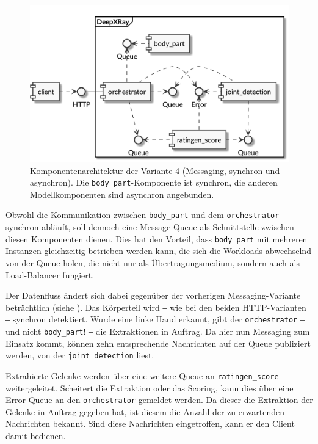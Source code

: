 \begin{figure}[tbh]
    \centering
    \includegraphics[width=\linewidth]{pics/architektur-variante-queue-2.png}
    \caption{Komponentenarchitektur der Variante 4 (Messaging, synchron und asynchron). Die \texttt{body\_part}-Komponente ist synchron, die anderen Modellkomponenten sind asynchron angebunden.}
    \label{fig:architektur-variante-queue-2}
\end{figure}

Obwohl die Kommunikation zwischen \texttt{body\_part} und dem \texttt{orchestrator} synchron abläuft, soll dennoch eine Message-Queue als Schnittstelle zwischen diesen Komponenten dienen. Dies hat den Vorteil, dass \texttt{body\_part} mit mehreren Instanzen gleichzeitig betrieben werden kann, die sich die Workloads abwechselnd von der Queue holen, die nicht nur als Übertragungsmedium, sondern auch als Load-Balancer fungiert.

Der Datenfluss ändert sich dabei gegenüber der vorherigen Messaging-Variante beträchtlich (siehe ). Das Körperteil wird ‒ wie bei den beiden HTTP-Varianten ‒ synchron detektiert. Wurde eine linke Hand erkannt, gibt der \texttt{orchestrator} ‒ und nicht \texttt{body\_part}! ‒ die Extraktionen in Auftrag. Da hier nun Messaging zum Einsatz kommt, können zehn entsprechende Nachrichten auf der Queue publiziert werden, von der \texttt{joint\_detection} liest.

Extrahierte Gelenke werden über eine weitere Queue an \texttt{ratingen\_score} weitergeleitet. Scheitert die Extraktion oder das Scoring, kann dies über eine Error-Queue an den \texttt{orchestrator} gemeldet werden. Da dieser die Extraktion der Gelenke in Auftrag gegeben hat, ist diesem die Anzahl der zu erwartenden Nachrichten bekannt. Sind diese Nachrichten eingetroffen, kann er den Client damit bedienen.

